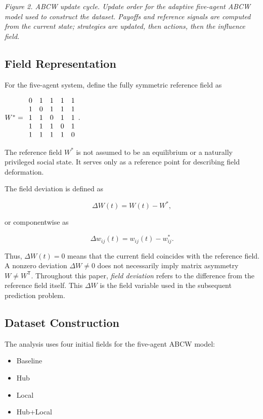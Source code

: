 \documentclass[
  11pt,
]{article}
\providecommand{\tightlist}{%
  \setlength{\itemsep}{0pt}\setlength{\parskip}{0pt}}
\begin{document}
\emph{Figure 2. ABCW update cycle. Update order for the adaptive
five-agent ABCW model used to construct the dataset. Payoffs and
reference signals are computed from the current state; strategies are
updated, then actions, then the influence field.}

\hypertarget{field-representation}{%
\subsection{Field Representation}\label{field-representation}}

For the five-agent system, define the fully symmetric reference field as

\({W^\ast= \begin{array}{ccccc} 0&1&1&1&1\cr 1&0&1&1&1\cr 1&1&0&1&1\cr 1&1&1&0&1\cr 1&1&1&1&0 \end{array}.}\)

The reference field \({W^\ast}\) is not assumed to be an equilibrium or
a naturally privileged social state. It serves only as a reference point
for describing field deformation.

The field deviation is defined as

\[{\Delta W(t)=W(t)-W^\ast,}\]

or componentwise as

\[{\Delta w_{ij}(t)=w_{ij}(t)-w^\ast_{ij}.}\]

Thus, \({\Delta W(t)=0}\) means that the current field coincides with
the reference field. A nonzero deviation \({\Delta W\neq0}\) does not
necessarily imply matrix asymmetry \({W\neq W^{\mathsf T}}\). Throughout
this paper, \emph{field deviation} refers to the difference from the
reference field itself. This \({\Delta W}\) is the field variable used
in the subsequent prediction problem.

\hypertarget{dataset-construction}{%
\subsection{Dataset Construction}\label{dataset-construction}}

The analysis uses four initial fields for the five-agent ABCW model:

\begin{itemize}
\tightlist
\item
  Baseline
\item
  Hub
\item
  Local
\item
  Hub+Local
\end{itemize}
\end{document}
